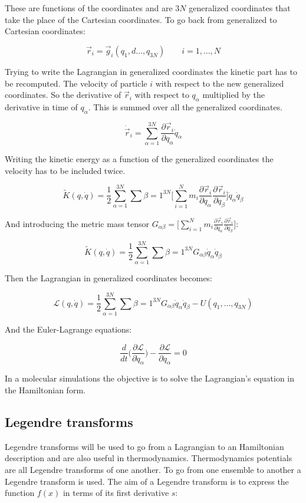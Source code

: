 	These are functions of the coordinates and are $3N$ generalized coordinates that take the place of the Cartesian coordinates.
	To go back from generalized to Cartesian coordinates:

	$$\vec{r}_i =\vec{g}_i(q_1, d\dots, q_{3N})\qquad i =1, \dots, N$$

	Trying to write the Lagrangian in generalized coordinates the kinetic part has to be recomputed.
	The velocity of particle $i$ with respect to the new generalized coordinates.
	So the derivative of $\vec{r}_i$ with respect to $q_\alpha$ multiplied by the derivative in time of $q_\alpha$.
	This is summed over all the generalized coordinates.

	$$\dot{\vec{r}}_i = \sum\limits_{\alpha=1}^{3N}\frac{\partial \vec{r}_i}{\partial q_\alpha}\dot{q}_\alpha$$

	Writing the kinetic energy as a function of the generalized coordinates the velocity has to be included twice.

	$$\tilde{K}(q, \dot{q}) = \frac{1}{2}\sum\limits_{\alpha=1}^{3N}\sum\limits{\beta=1}^{3N}\biggl[\sum\limits_{i=1}^Nm_i\frac{\partial\vec{r}_i}{\partial q_\alpha}\frac{\partial\vec{r}_i}{\partial q_\beta}\biggr]\dot{q}_\alpha\dot{q}_\beta$$

	And introducing the metric mass tensor $G_{\alpha\beta} = \biggl[\sum\limits_{i=1}^Nm_i\frac{\partial\vec{r}_i}{\partial q_\alpha}\frac{\partial\vec{r}_i}{\partial q_\beta}\biggr]$:

	$$\tilde{K}(q, \dot{q}) = \frac{1}{2}\sum\limits_{\alpha=1}^{3N}\sum\limits{\beta=1}^{3N}G_{\alpha\beta}\dot{q}_\alpha\dot{q}_\beta$$

	Then the Lagrangian in generalized coordinates becomes:

	$$\mathcal{L}(q, \dot{q}) =\frac{1}{2}\sum\limits_{\alpha=1}^{3N}\sum\limits{\beta=1}^{3N}G_{\alpha\beta}\dot{q}_\alpha\dot{q}_\beta - U(q_1, \dots, q_{3N})$$

	And the Euler-Lagrange equations:

	$$\frac{d}{dt}\biggl(\frac{\partial\mathcal{L}}{\partial\dot{q}_\alpha}\biggr) -\frac{\partial\mathcal{L}}{\partial q_\alpha} = 0$$

	In a molecular simulations the objective is to solve the Lagrangian's equation in the Hamiltonian form.

	\subsection{Legendre transforms}
	Legendre transforms will be used to go from a Lagrangian to an Hamiltonian description and are also useful in thermodynamics.
	Thermodynamics potentials are all Legendre transforms of one another.
	To go from one ensemble to another a Legendre transform is used.
	The aim of a Legendre transform is to express the function $f(x)$ in terms of its first derivative $s$:

